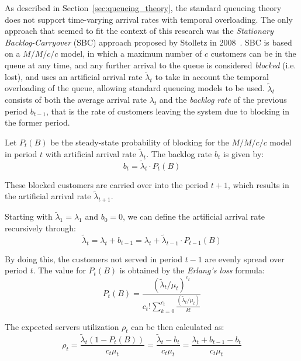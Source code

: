 As described in Section~\ref{sec:queueing_theory}, the standard queueing theory does not support time-varying arrival rates with temporal overloading. The only approach that seemed to fit the context of this research was the \emph{Stationary Backlog-Carryover} (SBC) approach proposed by Stolletz in 2008~\cite{stolletz}. SBC is based on a \( M/M/c/c \) model, in which a maximum number of \( c \) customers can be in the queue at any time, and any further arrival to the queue is considered \emph{blocked} (i.e. lost), and uses an artificial arrival rate \( \widetilde{\lambda}_t \) to take in account the temporal overloading of the queue, allowing standard queueing models to be used. \( \widetilde{\lambda}_t \) consists of both the average arrival rate \( \lambda_t \) and the \emph{backlog rate} of the previous period \( b_{t-1} \), that is the rate of customers leaving the system due to blocking in the former period.

Let \( P_t(B) \) be the steady-state probability of blocking for the \( M/M/c/c \) model in period \( t \) with artificial arrival rate \( \widetilde{\lambda}_t \). The backlog rate \( b_t \) is given by:
\begin{equation}
  b_t = \widetilde{\lambda}_t \cdot P_t(B)
\end{equation}

These blocked customers are carried over into the period \( t+1 \), which results in the artificial arrival rate \( \widetilde{\lambda}_{t+1} \).

Starting with \( \widetilde{\lambda}_1 = \lambda_1 \) and \( b_0 = 0 \), we can define the artificial arrival rate recursively through:
\begin{equation}
  \widetilde{\lambda}_t = \lambda_t + b_{t-1} = \lambda_t + \widetilde{\lambda}_{t-1} \cdot P_{t-1}(B)
\end{equation}

By doing this, the customers not served in period \( t-1 \) are evenly spread over period \( t \). The value for \( P_t(B) \) is obtained by the \emph{Erlang’s loss} formula:
\begin{equation}
  P_t(B) = \frac{(\widetilde{\lambda}_t / \mu_t)^{c_t}}{c_t!\sum_{k=0}^{c_t} \frac{(\widetilde{\lambda}_t / \mu_t)}{k!}}
\end{equation}

The expected servers utilization \( \rho_t \) can be then calculated as:
\begin{equation}
  \rho_t = \frac{\widetilde{\lambda}_t(1 - P_t(B))}{c_t\mu_t} = \frac{\widetilde{\lambda}_t - b_t}{c_t\mu_t} = \frac{\lambda_t + b_{t-1} - b_t}{c_t\mu_t}
  \label{eq:2}
\end{equation}

